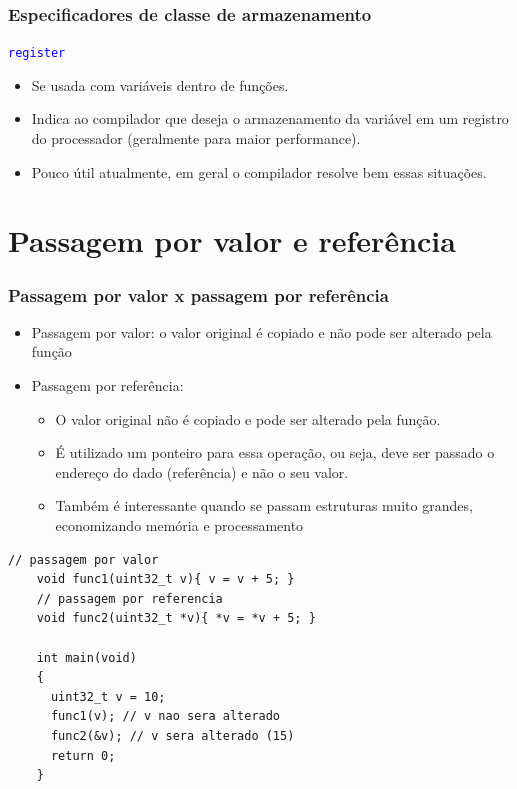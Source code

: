 \documentclass{beamer}
\begin{document}
\begin{frame}
	\frametitle{Especificadores de classe de armazenamento}
	\begin{center}
		\texttt{\textcolor{blue}{register}}
	\end{center}
	\vspace*{0.5cm}
	\begin{itemize}
		\item Se usada com variáveis dentro de funções.
		\item Indica ao compilador que deseja o armazenamento da variável em um registro do processador (geralmente para maior performance).
		\item Pouco útil atualmente, em geral o compilador resolve bem essas situações.
	\end{itemize}
\end{frame}

\section{Passagem por valor e referência}

\begin{frame}[fragile]
	\frametitle{Passagem por valor x passagem por referência}
	\begin{itemize}
		\item Passagem por valor: o valor original é copiado e não pode ser alterado pela função
		\item Passagem por referência:
		\begin{itemize}
			\item O valor original não é copiado e pode ser alterado pela função.
            \item É utilizado um ponteiro para essa operação, ou seja, deve ser passado o endereço do dado (referência) e não o seu valor.
			\item Também é interessante quando se passam estruturas muito grandes, economizando memória e processamento
		\end{itemize}
	\end{itemize}
    {\tiny
	\begin{lstlisting}[style=customc]
    // passagem por valor
    void func1(uint32_t v){ v = v + 5; }
    // passagem por referencia
    void func2(uint32_t *v){ *v = *v + 5; }

    int main(void)
    {
      uint32_t v = 10;
      func1(v); // v nao sera alterado
      func2(&v); // v sera alterado (15)
      return 0;
    }
	\end{lstlisting}
    }
\end{frame}
\end{document}

